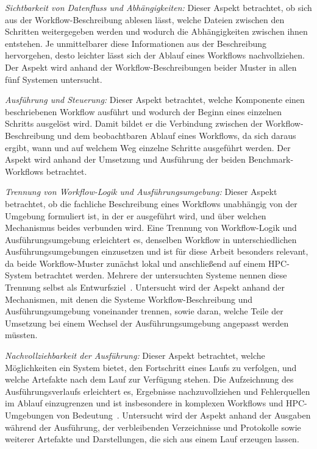\emph{Sichtbarkeit von Datenfluss und Abhängigkeiten:} Dieser Aspekt betrachtet, ob sich aus der Workflow-Beschreibung ablesen lässt, welche Dateien zwischen den Schritten weitergegeben werden und wodurch die Abhängigkeiten zwischen ihnen entstehen. Je unmittelbarer diese Informationen aus der Beschreibung hervorgehen, desto leichter lässt sich der Ablauf eines Workflows nachvollziehen. Der
Aspekt wird anhand der Workflow-Beschreibungen beider Muster in
allen fünf Systemen untersucht.

\emph{Ausführung und Steuerung:} Dieser Aspekt betrachtet, welche
Komponente einen beschriebenen Workflow ausführt und wodurch der
Beginn eines einzelnen Schritts ausgelöst wird. Damit bildet er die
Verbindung zwischen der Workflow-Beschreibung und dem beobachtbaren
Ablauf eines Workflows, da sich daraus ergibt, wann und auf welchem
Weg einzelne Schritte ausgeführt werden. Der Aspekt wird anhand der
Umsetzung und Ausführung der beiden Benchmark-Workflows betrachtet.

\emph{Trennung von Workflow-Logik und Ausführungsumgebung:} Dieser Aspekt betrachtet, ob die fachliche Beschreibung eines Workflows unabhängig von der Umgebung formuliert ist, in der er ausgeführt wird, und über welchen Mechanismus beides verbunden wird. Eine Trennung von Workflow-Logik und Ausführungsumgebung erleichtert es, denselben Workflow in unterschiedlichen Ausführungsumgebungen einzusetzen und ist für diese Arbeit besonders relevant, da beide Workflow-Muster zunächst lokal und anschließend auf einem HPC-System betrachtet werden. Mehrere der untersuchten Systeme nennen diese Trennung selbst als Entwurfsziel~\cite[S.~1723]{colonnelli2021streamflow}\cite[S.~18--20]{deelman2015pegasus}. Untersucht wird der Aspekt anhand der Mechanismen, mit denen die Systeme Workflow-Beschreibung und Ausführungsumgebung voneinander trennen, sowie daran, welche Teile der Umsetzung bei einem Wechsel der Ausführungsumgebung angepasst werden müssten.

\emph{Nachvollziehbarkeit der Ausführung:} Dieser Aspekt betrachtet, welche Möglichkeiten ein System bietet, den Fortschritt eines Laufs zu verfolgen, und welche Artefakte nach dem Lauf zur Verfügung stehen. Die Aufzeichnung des Ausführungsverlaufs erleichtert es, Ergebnisse nachzuvollziehen und Fehlerquellen im Ablauf einzugrenzen und ist insbesondere in komplexen Workflows und HPC-Umgebungen von Bedeutung~\cite{davidson2008provenance,sacco2024provenance}. Untersucht wird der Aspekt anhand der Ausgaben während der Ausführung, der verbleibenden Verzeichnisse und Protokolle sowie weiterer Artefakte und Darstellungen, die sich aus einem Lauf erzeugen lassen.

